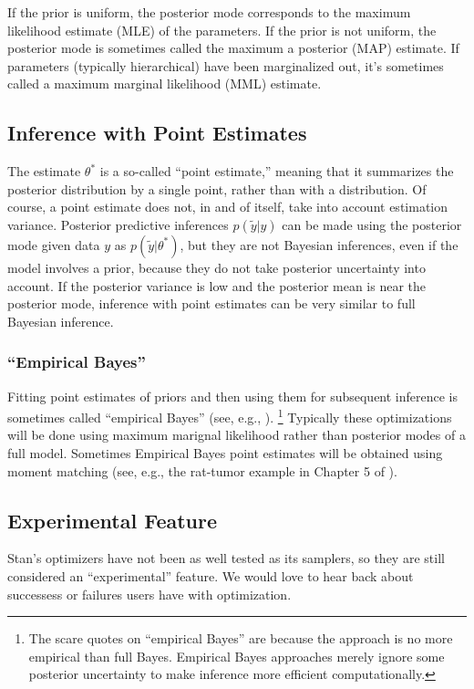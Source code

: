 If the prior is uniform, the posterior mode corresponds to the maximum
likelihood estimate (MLE) of the parameters.  If the prior is not
uniform, the posterior mode is sometimes called the maximum a
posterior (MAP) estimate.  If parameters (typically hierarchical) have
been marginalized out, it's sometimes called a maximum marginal
likelihood (MML) estimate. 


\subsection{Inference with Point Estimates}

The estimate $\theta^{*}$ is a so-called ``point estimate,'' meaning
that it summarizes the posterior distribution by a single point,
rather than with a distribution.  Of course, a point estimate does
not, in and of itself, take into account estimation variance.
Posterior predictive inferences $p(\tilde{y} | y)$ can be made using
the posterior mode given data $y$ as $p(\tilde{y}|\theta^*)$, but they
are not Bayesian inferences, even if the model involves a prior,
because they do not take posterior uncertainty into account.  If the
posterior variance is low and the posterior mean is near the posterior
mode, inference with point estimates can be very similar to full
Bayesian inference.

\subsubsection{``Empirical Bayes''}

Fitting point estimates of priors and then using them for subsequent
inference is sometimes called ``empirical Bayes'' (see, e.g.,
\citep{Efron:2012}).%
%
\footnote{The scare quotes on ``empirical Bayes'' are because the
  approach is no more empirical than full Bayes.  Empirical Bayes
  approaches merely ignore some posterior uncertainty to make
  inference more efficient computationally.}
%
Typically these optimizations will be done using maximum marignal
likelihood rather than posterior modes of a full model.  Sometimes
Empirical Bayes point estimates will be obtained using moment matching
(see, e.g., the rat-tumor example in Chapter 5 of
\citep{GelmanCarlinSternRubin:2003}).


\subsection{Experimental Feature}

Stan's optimizers have not been as well tested as its samplers, so
they are still considered an ``experimental'' feature.  We would love
to hear back about successess or failures users have with
optimization.  



